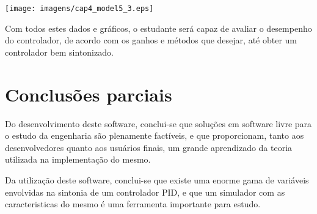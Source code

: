         \begin{center}
            \texttt{[image: imagens/cap4\_model5\_3.eps]}
        \end{center}
        
        Com todos estes dados e gráficos, o estudante será capaz de avaliar o desempenho
        do controlador, de acordo com os ganhos e métodos que desejar, até obter um
        controlador bem sintonizado.

\section{Conclusões parciais}

    Do desenvolvimento deste software, conclui-se que soluções em software livre
    para o estudo da engenharia são plenamente factíveis, e que proporcionam, tanto
    aos desenvolvedores quanto aos usuários finais, um grande aprendizado da teoria
    utilizada na implementação do mesmo.

    Da utilização deste software, conclui-se que existe uma enorme gama de variáveis
    envolvidas na sintonia de um controlador \acs{PID}, e que um simulador com as
    caracteristicas do mesmo é uma ferramenta importante para estudo.

